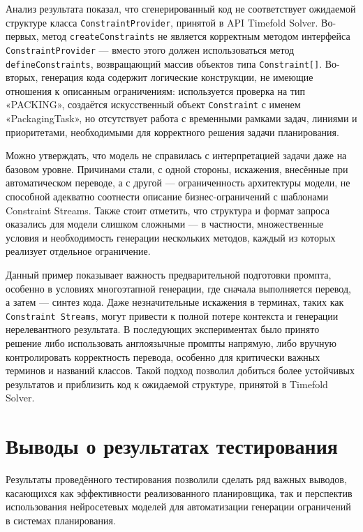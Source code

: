 Анализ результата показал, что сгенерированный код не соответствует ожидаемой структуре класса \texttt{ConstraintProvider}, принятой в API Timefold Solver. Во-первых, метод \texttt{createConstraints} не является корректным методом интерфейса \texttt{ConstraintProvider} — вместо этого должен использоваться метод \texttt{defineConstraints}, возвращающий массив объектов типа \texttt{Constraint[]}. Во-вторых, генерация кода содержит логические конструкции, не имеющие отношения к описанным ограничениям: используется проверка на тип «PACKING», создаётся искусственный объект \texttt{Constraint} с именем «PackagingTask», но отсутствует работа с временными рамками задач, линиями и приоритетами, необходимыми для корректного решения задачи планирования.

Можно утверждать, что модель не справилась с интерпретацией задачи даже на базовом уровне. Причинами стали, с одной стороны, искажения, внесённые при автоматическом переводе, а с другой — ограниченность архитектуры модели, не способной адекватно соотнести описание бизнес-ограничений с шаблонами Constraint Streams. Также стоит отметить, что структура и формат запроса оказались для модели слишком сложными — в частности, множественные условия и необходимость генерации нескольких методов, каждый из которых реализует отдельное ограничение.

Данный пример показывает важность предварительной подготовки промпта, особенно в условиях многоэтапной генерации, где сначала выполняется перевод, а затем — синтез кода. Даже незначительные искажения в терминах, таких как \texttt{Constraint Streams}, могут привести к полной потере контекста и генерации нерелевантного результата. В последующих экспериментах было принято решение либо использовать англоязычные промпты напрямую, либо вручную контролировать корректность перевода, особенно для критически важных терминов и названий классов. Такой подход позволил добиться более устойчивых результатов и приблизить код к ожидаемой структуре, принятой в Timefold Solver.


\section{Выводы о результатах тестирования}

Результаты проведённого тестирования позволили сделать ряд важных выводов, касающихся как эффективности реализованного планировщика, так и перспектив использования нейросетевых моделей для автоматизации генерации ограничений в системах планирования.

